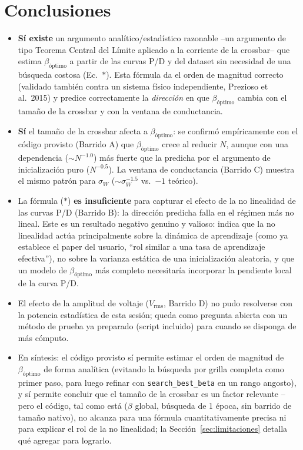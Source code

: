 \documentclass[11pt]{article}
\begin{document}
\section{Conclusiones}

\begin{itemize}
  \item \textbf{Sí existe} un argumento analítico/estadístico razonable --un
    argumento de tipo Teorema Central del Límite aplicado a la corriente de la
    crossbar-- que estima $\beta_{\text{óptimo}}$ a partir de las curvas P/D y del
    dataset sin necesidad de una búsqueda costosa (Ec.~$\ast$). Esta fórmula da el
    orden de magnitud correcto (validado también contra un sistema físico
    independiente, Prezioso et al.\ 2015) y predice correctamente la
    \emph{dirección} en que $\beta_{\text{óptimo}}$ cambia con el tamaño de la
    crossbar y con la ventana de conductancia.

  \item \textbf{Sí} el tamaño de la crossbar afecta a $\beta_{\text{óptimo}}$: se
    confirmó empíricamente con el código provisto (Barrido A) que
    $\beta_{\text{óptimo}}$ crece al reducir $N$, aunque con una dependencia
    ($\sim N^{-1.0}$) más fuerte que la predicha por el
    argumento de inicialización puro ($N^{-0.5}$). La ventana de conductancia
    (Barrido C) muestra el mismo patrón para $\sigma_W$
    ($\sim\sigma_W^{-1.5}$ vs.\ $-1$ teórico).

  \item La fórmula ($\ast$) \textbf{es insuficiente} para capturar el efecto de la
    no linealidad de las curvas P/D (Barrido B): la dirección predicha falla en el
    régimen más no lineal. Este es un resultado negativo genuino y valioso: indica
    que la no linealidad actúa principalmente sobre la dinámica de aprendizaje (como
    ya establece el paper del usuario, ``rol similar a una tasa de aprendizaje
    efectiva''), no sobre la varianza estática de una inicialización aleatoria, y
    que un modelo de $\beta_{\text{óptimo}}$ más completo necesitaría incorporar la
    pendiente local de la curva P/D.

  \item El efecto de la amplitud de voltaje ($V_{\text{rms}}$, Barrido D) no pudo
    resolverse con la potencia estadística de esta sesión; queda como pregunta
    abierta con un método de prueba ya preparado (script incluido) para cuando se
    disponga de más cómputo.

  \item En síntesis: el código provisto sí permite estimar el orden de magnitud de
    $\beta_{\text{óptimo}}$ de forma analítica (evitando la búsqueda por grilla
    completa como primer paso, para luego refinar con \texttt{search\_best\_beta} en
    un rango angosto), y sí permite concluir que el tamaño de la crossbar es un
    factor relevante --pero el código, tal como está ($\beta$ global, búsqueda de
    1 época, sin barrido de tamaño nativo), no alcanza para una fórmula
    cuantitativamente precisa ni para explicar el rol de la no linealidad; la
    Sección~\ref{sec:limitaciones} detalla qué agregar para lograrlo.
\end{itemize}
\end{document}
